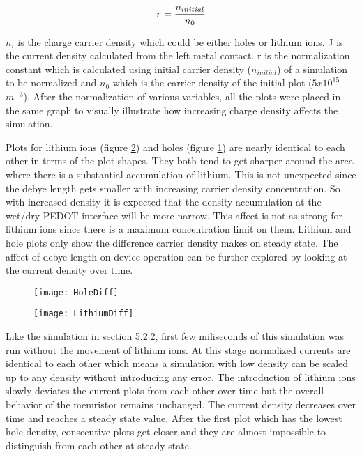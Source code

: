 {\begin{equation}
\centering
r = \frac{n_{initial}}{n_{0}}
\label{NormConst}
\end{equation}

$n_{i}$ is the charge carrier density which could be either holes or lithium ions. J is the current density calculated from the left metal contact. r is the normalization constant which is calculated using initial carrier density ($n_{initial}$) of a simulation to be normalized and $n_{0}$ which is the carrier density of the initial plot ($5x10^{15}$ $m^{-3}$). After the normalization of various variables, all the plots were placed in the same graph to visually illustrate how increasing charge density affects the simulation. 

Plots for lithium ions (figure \ref{LithiumDiff}) and holes (figure \ref{HoleDiff}) are nearly identical to each other in terms of the plot shapes. They both tend to get sharper around the area where there is a substantial accumulation of lithium. This is not unexpected since the debye length gets smaller with increasing carrier density concentration. So with increased density it is expected that the density accumulation at the wet/dry PEDOT interface will be more narrow. This affect is not as strong for lithium ions since there is a maximum concentration limit on them. Lithium and hole plots only show the difference carrier density makes on steady state. The affect of debye length on device operation can be further explored by looking at the current density over time.   

\begin{figure}[!htp]
\centering
\texttt{[image: HoleDiff]}
\caption{} 
\label{HoleDiff}
\end{figure}

\begin{figure}[!htp]
\centering
\texttt{[image: LithiumDiff]}
\caption{} 
\label{LithiumDiff}
\end{figure}

Like the simulation in section 5.2.2, first few miliseconds of this simulation was run without the movement of lithium ions. At this stage normalized currents are identical to each other which means a simulation with low density can be scaled up to any density without introducing any error. The introduction of lithium ions slowly deviates the current plots from each other over time but the overall behavior of the memristor remains unchanged. The current density decreases over time and reaches a steady state value. After the first plot which has the lowest hole density, consecutive plots get closer and they are almost impossible to distinguish from each other at steady state.

}
